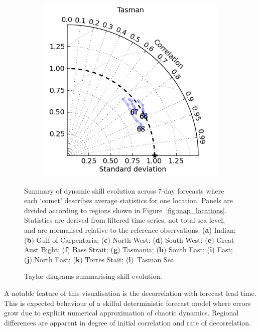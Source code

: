 \begin{figure}[!hbt]
\begin{subfigure}{0.30\textwidth}
        \caption{}
    \end{subfigure}
    \begin{subfigure}{0.30\textwidth}
        \includegraphics[width=\textwidth]{figures/plots/taylor_diag_res_Tasman.png}
        \caption{}
    \end{subfigure}
    \caption{Taylor diagrams summarising skill evolution.}
    {Summary of dynamic skill evolution across 7-day forecasts where each `comet' describes average statistics for one location.
    Panels are divided according to regions shown in Figure~\ref{fig:map_locations}.
    Statistics are derived from filtered time series, not total sea level, and are normalised relative to the reference observations. (\textbf{a}) Indian; (\textbf{b}) Gulf of Carpentaria; (\textbf{c}) North West; (\textbf{d}) South West; (\textbf{e}) Great Aust Bight; (\textbf{f}) Bass Strait; (\textbf{g}) Tasmania; (\textbf{h}) South East; (\textbf{i}) East; (\textbf{j}) North East; (\textbf{k}) Torres Stait; (\textbf{l})~Tasman Sea. }
    \label{fig:taylors}
\end{figure}   
A notable feature of this visualisation is the decorrelation with forecast lead time.   
This is expected behaviour of a skilful deterministic forecast model where errors grow due to explicit numerical approximation of chaotic dynamics. 
Regional differences are apparent in degree of initial correlation and rate of decorrelation.

